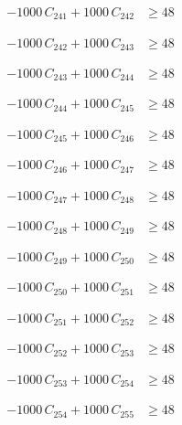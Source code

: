 \documentclass[a4paper,11pt]{article}
\begin{document}
\begin{align}
-1000\,C_{241} + 1000\,C_{242} &\geq 48 \nonumber
\end{align}

\begin{align}
-1000\,C_{242} + 1000\,C_{243} &\geq 48 \nonumber
\end{align}

\begin{align}
-1000\,C_{243} + 1000\,C_{244} &\geq 48 \nonumber
\end{align}

\begin{align}
-1000\,C_{244} + 1000\,C_{245} &\geq 48 \nonumber
\end{align}

\begin{align}
-1000\,C_{245} + 1000\,C_{246} &\geq 48 \nonumber
\end{align}

\begin{align}
-1000\,C_{246} + 1000\,C_{247} &\geq 48 \nonumber
\end{align}

\begin{align}
-1000\,C_{247} + 1000\,C_{248} &\geq 48 \nonumber
\end{align}

\begin{align}
-1000\,C_{248} + 1000\,C_{249} &\geq 48 \nonumber
\end{align}

\begin{align}
-1000\,C_{249} + 1000\,C_{250} &\geq 48 \nonumber
\end{align}

\begin{align}
-1000\,C_{250} + 1000\,C_{251} &\geq 48 \nonumber
\end{align}

\begin{align}
-1000\,C_{251} + 1000\,C_{252} &\geq 48 \nonumber
\end{align}

\begin{align}
-1000\,C_{252} + 1000\,C_{253} &\geq 48 \nonumber
\end{align}

\begin{align}
-1000\,C_{253} + 1000\,C_{254} &\geq 48 \nonumber
\end{align}

\begin{align}
-1000\,C_{254} + 1000\,C_{255} &\geq 48 \nonumber
\end{align}
\end{document}
